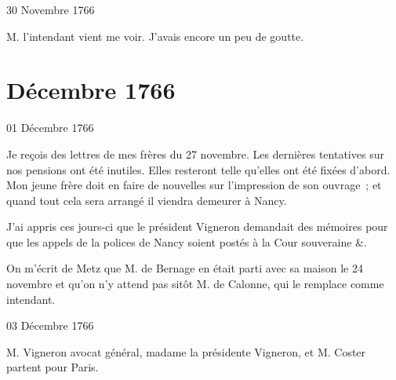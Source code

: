                      \begin{diary}{30 Novembre 1766}{}
                        
                        
                           M. l’intendant vient me voir.
                           J’avais
                           encore un peu de goutte. \bigskip
        
        
                     \end{diary}
                  \chapter*{Décembre 1766}
                     
                     
                     \begin{diary}{01 Décembre 1766}{}
                        
                         Je reçois des lettres de mes
                              frères du
                           27 novembre. Les dernières
                           tentatives
                           sur nos pensions ont été inutiles. Elles
                           resteront telle qu’elles ont été fixées d’abord.
                           Mon jeune frère doit
                           en faire de nouvelles
                           sur l’impression de son ouvrage ; et quand
                           tout cela sera arrangé il viendra demeurer
                           à Nancy. \bigskip
        
        
                         J’ai appris ces jours-ci que le président
                              Vigneron demandait des mémoires pour
                           que les appels de la polices de Nancy
                           soient
                           postés à la Cour souveraine &. \bigskip
        
        
                         On m’écrit de Metz que M. de
                              Bernage
                           en était parti avec sa maison le 24
                              novembre et qu’on n’y attend pas sitôt M.
                              de Calonne, qui le remplace comme intendant. \bigskip
        
        
                     \end{diary}

                     \begin{diary}{03 Décembre 1766}{}
                        
                        
                           M. Vigneron avocat
                           général, madame la présidente
                              Vigneron, et M.
                              Coster partent pour Paris. \bigskip
        
        
                     \end{diary}


